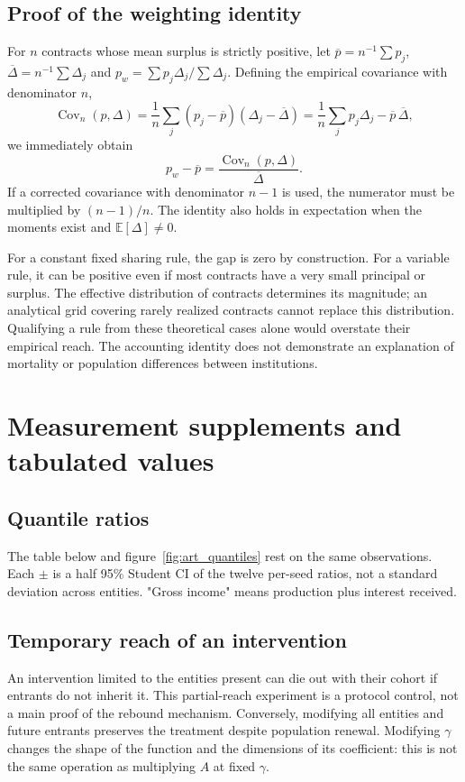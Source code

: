 \subsection{Proof of the weighting identity}\label{sec:ponderation}
For $n$ contracts whose mean surplus is strictly positive,
let $\overline p=n^{-1}\sum p_j$,
$\overline\Delta=n^{-1}\sum\Delta_j$ and
$p_w=\sum p_j\Delta_j/\sum\Delta_j$.
Defining the empirical covariance with denominator $n$,
\[
 \operatorname{Cov}_n(p,\Delta)
 =\frac1n\sum_j(p_j-\overline p)(\Delta_j-\overline\Delta)
 =\frac1n\sum_jp_j\Delta_j-\overline p\,\overline\Delta,
\]
we immediately obtain
\begin{equation}
 p_w-\overline p=\frac{\operatorname{Cov}_n(p,\Delta)}{\overline\Delta}.
 \label{eq:identite}
\end{equation}
If a corrected covariance with denominator $n-1$ is used,
the numerator must be multiplied by $(n-1)/n$. The identity also
holds in expectation when the moments exist and
$\mathbb E[\Delta]\ne0$.

For a constant fixed sharing rule, the gap is zero by construction.
For a variable rule, it can be positive even if most
contracts have a very small principal or surplus. The
effective distribution of contracts determines its magnitude; an
analytical grid covering rarely realized contracts cannot
replace this distribution. Qualifying a rule from
these theoretical cases alone would overstate their empirical reach.
The accounting identity does not demonstrate an explanation of
mortality or population differences between institutions.

\section{Measurement supplements and tabulated values}\label{sec:tableaux}
\subsection{Quantile ratios}
The table below and figure~\ref{fig:art_quantiles} rest
on the same observations. Each $\pm$ is a half 95\% Student CI
of the twelve per-seed ratios, not a standard deviation across
entities. "Gross income" means production plus interest received.
\onecolumn
\begin{small}\end{small}
\twocolumn

\subsection{Temporary reach of an intervention}
An intervention limited to the entities present can die out
with their cohort if entrants do not inherit it. This
partial-reach experiment is a protocol control,
not a main proof of the rebound mechanism. Conversely,
modifying all entities and future entrants preserves
the treatment despite population renewal. Modifying
$\gamma$ changes the shape of the function and the dimensions of
its coefficient: this is not the same operation as multiplying
$A$ at fixed $\gamma$.

